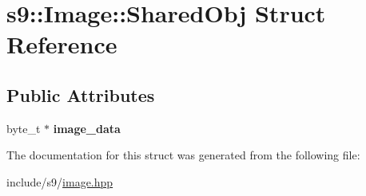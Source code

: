 \hypertarget{structs9_1_1Image_1_1SharedObj}{\section{s9\-:\-:\-Image\-:\-:\-Shared\-Obj \-Struct \-Reference}
\label{structs9_1_1Image_1_1SharedObj}
}
\subsection*{\-Public \-Attributes}
\begin{DoxyCompactItemize}
\item 
\hypertarget{structs9_1_1Image_1_1SharedObj_a1aa593be0f30553d8908d4de9cc2f8f1}{byte\-\_\-t $\ast$ {\bfseries image\-\_\-data}}\label{structs9_1_1Image_1_1SharedObj_a1aa593be0f30553d8908d4de9cc2f8f1}

\end{DoxyCompactItemize}


\-The documentation for this struct was generated from the following file\-:\begin{DoxyCompactItemize}
\item 
include/s9/\hyperlink{image_8hpp}{image.\-hpp}\end{DoxyCompactItemize}

